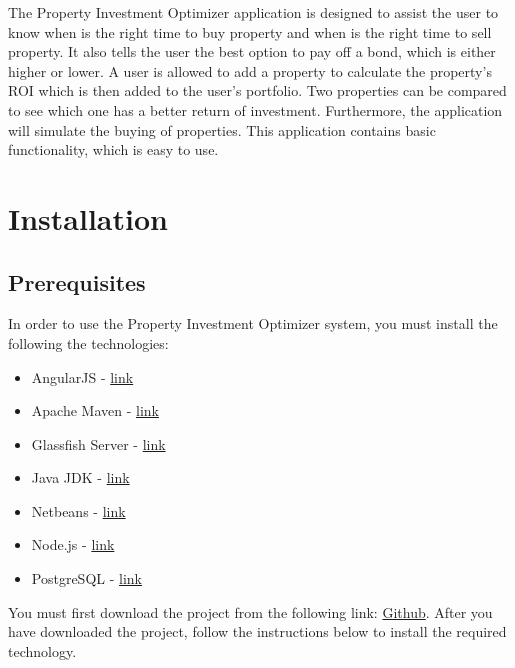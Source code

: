 \documentclass[a4paper,12pt]{article}
\begin{document}
The Property Investment Optimizer application is designed to assist the user to know when is the right time to buy property and when is the right time to sell property. It also tells the user the best option to pay off a bond, which is either higher or lower. A user is allowed to add a property to calculate the property's ROI which is then added to the user's portfolio. Two properties can be compared to see which one has a better return of investment. Furthermore, the application will simulate the buying of properties. This application contains basic functionality, which is easy to use.
\section{Installation}

\subsection{Prerequisites}
In order to use the Property Investment Optimizer system, you must install the following the technologies:
\begin{itemize}
\item{AngularJS - \href{https://angularjs.org/}{link}}
\item{Apache Maven - \href{https://maven.apache.org/download.cgi}{link}}
\item{Glassfish Server - \href{https://glassfish.java.net/download.html}{link}}
\item{Java JDK - \href{http://www.oracle.com/technetwork/java/javase/downloads/index.html}{link}}
\item{Netbeans - \href{https://netbeans.org/downloads/}{link}}
\item{Node.js - \href{https://nodejs.org/en/download/}{link}}
\item{PostgreSQL - \href{https://www.postgresql.org/download/}{link}}
\end{itemize}
You must first download the project from the following link: \href{https://github.com/u13278012/IMPAKD}{Github}. After you have downloaded the project, follow the instructions below to install the required technology.


\newpage
\end{document}
